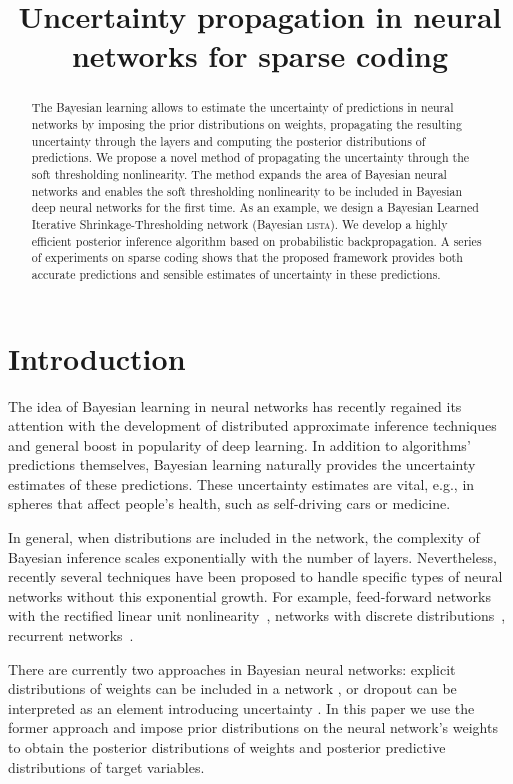 \documentclass{article}
\title{Uncertainty propagation in neural networks for sparse coding}
\author{} %
\begin{document}
\maketitle

\begin{abstract}
The Bayesian learning allows to estimate the uncertainty of predictions in neural networks by imposing the prior distributions on weights, propagating the resulting uncertainty through the layers and computing the posterior distributions of predictions. We propose a novel method of propagating the uncertainty through the soft thresholding nonlinearity. The method expands the area of Bayesian neural networks and enables the soft thresholding nonlinearity to be included in Bayesian deep neural networks for the first time. As an example, we design a Bayesian Learned Iterative Shrinkage-Thresholding network (Bayesian \textsc{lista}). We develop a highly efficient posterior inference algorithm based on probabilistic backpropagation. A series of experiments on sparse coding shows that the proposed framework provides both accurate predictions and sensible estimates of uncertainty in these predictions.
\end{abstract}

\section{Introduction}
The idea of Bayesian learning in neural networks \cite{neal2012bayesian} has recently regained its attention with the development of distributed approximate inference techniques \cite{li2015stochastic, hoffman2013stochastic} and general boost in popularity of deep learning. In addition to algorithms' predictions themselves, Bayesian learning naturally provides the uncertainty estimates of these predictions. These uncertainty estimates are vital, e.g., in spheres that affect people's health, such as self-driving cars or medicine.

In general, when distributions are included in the network, the complexity of Bayesian inference scales exponentially with the number of layers. Nevertheless, recently several techniques have been proposed to handle specific types of neural networks without this exponential growth. For example, feed-forward networks with the rectified linear unit nonlinearity~\cite{hernandez2015probabilistic}, networks with discrete distributions~\cite{soudry2014expectation}, recurrent networks~\cite{mcdermott2017bayesian}.

There are currently two approaches in Bayesian neural networks: explicit distributions of weights can be included in a network \cite{hernandez2015probabilistic, ranganath2015deep}, or dropout can be interpreted as an element introducing uncertainty \cite{gal2016dropout}. In this paper we use the former approach and impose prior distributions on the neural network's weights to obtain the posterior distributions of weights and posterior predictive distributions of target variables.
\end{document}
